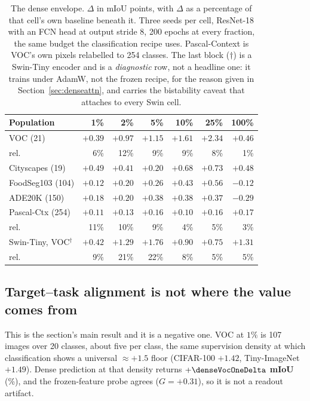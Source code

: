 \begin{table}[pos=htbp]
\caption{The dense envelope. $\Delta$ in mIoU points, with $\Delta$ as a
percentage of that cell's own baseline beneath it. Three seeds per cell,
ResNet-18 with an FCN head at output stride 8, 200 epochs at every fraction,
the same budget the classification recipe uses. Pascal-Context is VOC's own
pixels relabelled to 254 classes. The last block ($\dagger$) is a Swin-Tiny encoder and is
a \emph{diagnostic} row, not a headline one: it trains under AdamW, not the frozen recipe, for the reason given in Section~\ref{sec:denseattn}, and
carries the bistability caveat that attaches to every Swin cell.}
\label{tab:dense}
\centering\scriptsize
\setlength{\tabcolsep}{3.4pt}
\begin{tabular}{lrrrrrr}
\toprule
Population & 1\% & 2\% & 5\% & 10\% & 25\% & 100\% \\
\midrule
VOC (21)          & $+0.39$ & $+0.97$ & $+1.15$ & $+1.61$ & $+2.34$ & $+0.46$ \\
\quad rel.        & 6\%     & 12\%    & 9\%     & 9\%     & 8\%     & 1\%     \\
Cityscapes (19)   & $+0.49$ & $+0.41$ & $+0.20$ & $+0.68$ & $+0.73$ & $+0.48$ \\
FoodSeg103 (104)  & $+0.12$ & $+0.20$ & $+0.26$ & $+0.43$ & $+0.56$ & $-0.12$ \\
ADE20K (150)      & $+0.18$ & $+0.20$ & $+0.38$ & $+0.38$ & $+0.37$ & $-0.29$ \\
Pascal-Ctx (254)  & $+0.11$ & $+0.13$ & $+0.16$ & $+0.10$ & $+0.16$ & $+0.17$ \\
\quad rel.        & 11\%    & 10\%    & 9\%     & 4\%     & 5\%     & 3\%     \\
\midrule
Swin-Tiny, VOC$^{\dagger}$ & $+0.42$ & $+1.29$ & $+1.76$ & $+0.90$ & $+0.75$ & $+1.31$ \\
\quad rel.        & 9\%     & 21\%    & 22\%    & 8\%     & 5\%     & 5\%     \\
\bottomrule
\end{tabular}
\end{table}

\subsection{Target--task alignment is not where the value comes
from}\label{sec:densealign}
This is the section's main result and it is a negative one. VOC at $1\%$ is
107 images over 20 classes, about five per class, the same supervision
density at which classification shows a universal ${\approx}+1.5$ floor
(CIFAR-100 $+1.42$, Tiny-ImageNet $+1.49$). Dense prediction at that density
returns \textbf{$+\denseVocOneDelta$ mIoU} (\denseVocOneRel\%), and the
frozen-feature probe agrees ($G = +0.31$), so it is not a readout artifact.

